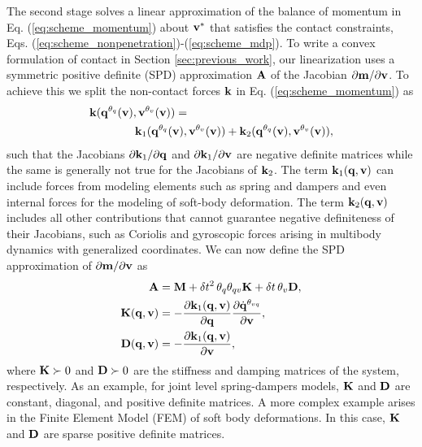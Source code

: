 The second stage solves a linear approximation of the balance of momentum in Eq.
(\ref{eq:scheme_momentum}) about ${\mathbf{v}}^*$ that satisfies the contact
constraints, Eqs. (\ref{eq:scheme_nonpenetration})-(\ref{eq:scheme_mdp}). To write
a convex formulation of contact in Section \ref{sec:previous_work}, our
linearization uses a symmetric positive definite (SPD) approximation ${\mathbf{A}}$ of
the Jacobian $\partial {\mathbf{m}}/\partial {\mathbf{v}}$. To achieve this we split the
non-contact forces ${\mathbf{k}}$ in Eq. (\ref{eq:scheme_momentum}) as
\begin{align*}
	&{\mathbf{k}}({\mathbf{q}}^{\theta_{q}}({\mathbf{v}}), {\mathbf{v}}^{\theta_v}({\mathbf{v}})) = \\
    &\qquad\qquad {\mathbf{k}}_1({\mathbf{q}}^{\theta_{q}}({\mathbf{v}}), {\mathbf{v}}^{\theta_v}({\mathbf{v}}))+
	{\mathbf{k}}_2({\mathbf{q}}^{\theta_{q}}({\mathbf{v}}), {\mathbf{v}}^{\theta_v}({\mathbf{v}})),
\end{align*}
such that the Jacobians $\partial {\mathbf{k}}_1/\partial{\mathbf{q}}$ and $\partial
{\mathbf{k}}_1/\partial{\mathbf{v}}$ are negative definite matrices while the same is
generally not true for the Jacobians of ${\mathbf{k}}_2$. The term ${\mathbf{k}}_1({\mathbf{q}},
{\mathbf{v}})$ can include forces from modeling elements such as spring and dampers
and even internal forces for the modeling of soft-body deformation. The term
${\mathbf{k}}_2({\mathbf{q}}, {\mathbf{v}})$ includes all other contributions that cannot
guarantee negative definiteness of their Jacobians, such as Coriolis and
gyroscopic forces arising in multibody dynamics with generalized coordinates. We
can now define the SPD approximation of $\partial {\mathbf{m}}/\partial {\mathbf{v}}$ as
\begin{align}
	\mf{A}&=\mf{M}+\delta t^2\,\theta_q\theta_{qv}\mf{K}+\delta t\,\theta_v\mf{D},
	\label{eq:expression_for_A}\\
	\mf{K}(\mf{q}, \mf{v})&=-\frac{\partial \mf{k}_1(\mf{q}, \mf{v})}{\partial
	\mf{q}}\frac{\partial\dot{\mf{q}}^{\theta_{vq}}}{\partial\mf{v}},
	\label{eq:stiffness_matrix}\\
	\mf{D}(\mf{q}, \mf{v})&=-\frac{\partial \mf{k}_1(\mf{q}, \mf{v})}{\partial
	\mf{v}},
	\label{eq:dissipation_matrix}
\end{align}
where ${\mathbf{K}} \succ 0$ and ${\mathbf{D}}\succ 0$ are the stiffness and damping
matrices of the system, respectively. As an example, for joint level
spring-dampers models, ${\mathbf{K}}$ and ${\mathbf{D}}$ are constant, diagonal, and
positive definite matrices. A more complex example arises in the Finite Element
Model (FEM) of soft body deformations. In this case, ${\mathbf{K}}$ and ${\mathbf{D}}$ are
sparse positive definite matrices.

